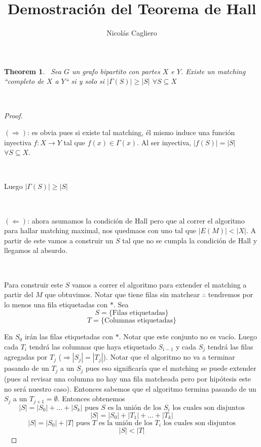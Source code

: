 \documentclass[11pt]{article}
\title{Demostración del Teorema de Hall}
\author{Nicolás Cagliero}
\newtheorem{theorem}{Theorem}
\begin{document}
\maketitle
\begin{theorem}\par
\
Sea $G$ un grafo bipartito con partes $X$ e $Y$. Existe un matching ``completo de $X$ a $Y$`` si y solo si $|\Gamma(S)| \ge |S|$ $\forall S \subseteq X$\par
\

\end{theorem}

\begin{proof} \par
\

$(\Rightarrow)$: es obvia pues si existe tal matching, él mismo induce una función inyectiva $f: X \rightarrow Y$ tal que $f(x) \in \Gamma(x)$. Al ser inyectiva, $|f(S)| = |S|$ $\forall S \subseteq X$.\par
\

Luego $|\Gamma(S)| \ge |S|$\par
\

$(\Leftarrow)$: ahora asumamos la condición de Hall pero que al correr el algoritmo para hallar matching maximal, nos quedmaos con uno tal que $|E(M)| < |X|$. A partir de este vamos a construir un $S$ tal que no se cumpla la condición de Hall y llegamos al absurdo.\par
\

Para construir este $S$ vamos a correr el algoritmo para extender el matching a partir del $M$ que obtuvimos. Notar que tiene filas sin matchear $\therefore$ tendremos por lo menos una fila etiquetadas con $*$. Sea \[S = \{\text{Filas etiquetadas}\}\] \[T = \{\text{Columnas etiquetadas}\}\]

En $S_0$ irán las filas etiquetadas con $*$. Notar que este conjunto no es vacío. Luego cada $T_i$ tendrá las columnas que haya etiquetado $S_{i-1}$ y cada $S_j$ tendrá las filas agregadas por $T_j$ ($\Rightarrow |S_j| = |T_j|$). Notar que el algoritmo no va a terminar pasando de un $T_j$ a un $S_j$ pues eso significaría que el matching se puede extender (pues al revisar una columna no hay una fila matcheada pero por hipótesis este no será nuestro caso). Entonces sabemos que el algoritmo termina pasando de un $S_j$ a un $T_{j+1} = \emptyset$. Entonces obtenemos \[|S| = |S_0| + ... + |S_k| \text{ pues $S$ es la unión de los $S_i$ los cuales son disjuntos}\] \[|S| = |S_0| + |T_1| + ... + |T_k|\] \[|S| = |S_0| + |T| \text{ pues $T$ es la unión de los $T_i$ los cuales son disjuntos}\] \[|S| < |T|\]
\


\end{proof}
\end{document}
